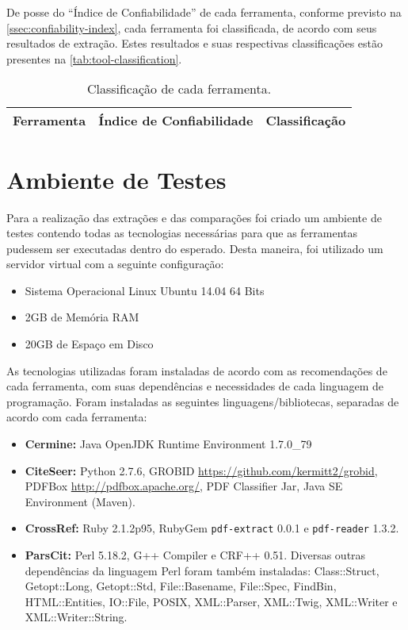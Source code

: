De posse do ``Índice de Confiabilidade'' de cada ferramenta, conforme previsto na \autoref{ssec:confiability-index}, cada ferramenta foi classificada, de acordo com seus resultados de extração. Estes resultados e suas respectivas classificações estão presentes na \autoref{tab:tool-classification}.

\begin{table}
    \caption{Classificação de cada ferramenta.}
    \begin{center}
        \begin{tabular}{|p{3cm}|C{5.5cm}|p{4cm}|}
            \hline 
            \textbf{Ferramenta} & \textbf{Índice de Confiabilidade} & \textbf{Classificação} \\ \hline 
            
        \end{tabular}
    \end{center}
    \label{tab:tool-classification}
\end{table}

\section{Ambiente de Testes}

Para a realização das extrações e das comparações foi criado um ambiente de testes contendo todas as tecnologias necessárias para que as ferramentas pudessem ser executadas dentro do esperado. Desta maneira, foi utilizado um servidor virtual com a seguinte configuração:

\begin{itemize}
    \item Sistema Operacional Linux Ubuntu 14.04 64 Bits
    \item 2GB de Memória RAM
    \item 20GB de Espaço em Disco
\end{itemize}

As tecnologias utilizadas foram instaladas de acordo com as recomendações de cada ferramenta, com suas dependências e necessidades de cada linguagem de programação. Foram instaladas as seguintes linguagens/bibliotecas, separadas de acordo com cada ferramenta:

\begin{itemize}
    \item \textbf{Cermine:} Java OpenJDK Runtime Environment 1.7.0\_79
    \item \textbf{CiteSeer:} Python 2.7.6, GROBID \url{https://github.com/kermitt2/grobid}, PDFBox \url{http://pdfbox.apache.org/}, PDF Classifier Jar, Java SE Environment (Maven). 
    \item \textbf{CrossRef:} Ruby 2.1.2p95, RubyGem \texttt{pdf-extract} 0.0.1 e \texttt{pdf-reader} 1.3.2.
    \item \textbf{ParsCit:} Perl 5.18.2, G++ Compiler e CRF++ 0.51. Diversas outras dependências da linguagem Perl foram também instaladas: Class::Struct, Getopt::Long, Getopt::Std, File::Basename, File::Spec, FindBin, HTML::Entities, IO::File, POSIX, XML::Parser, XML::Twig, XML::Writer e XML::Writer::String.
\end{itemize}

